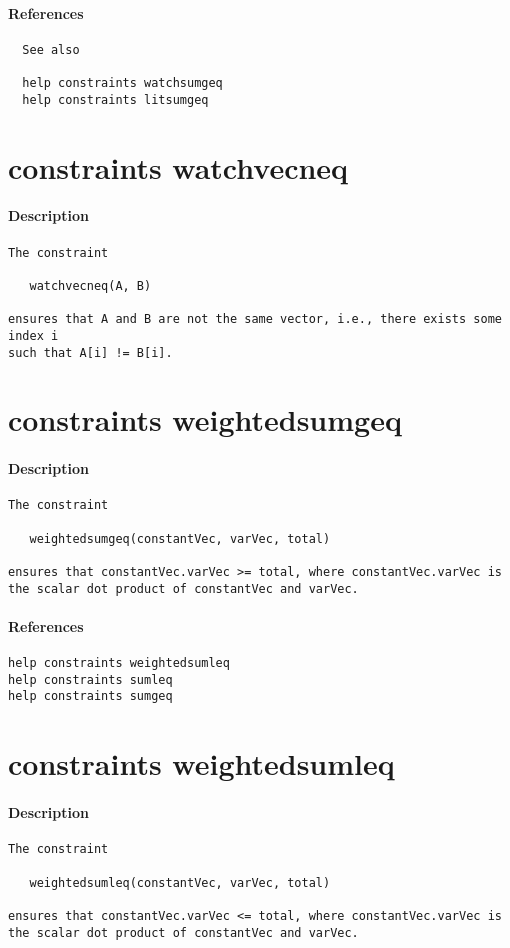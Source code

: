 \paragraph{References}
{\footnotesize
\begin{verbatim}
  See also

  help constraints watchsumgeq
  help constraints litsumgeq
\end{verbatim}
}
\section{constraints watchvecneq}
\paragraph{Description}
{\footnotesize
\begin{verbatim}
The constraint

   watchvecneq(A, B)

ensures that A and B are not the same vector, i.e., there exists some index i
such that A[i] != B[i].
\end{verbatim}
}
\section{constraints weightedsumgeq}
\paragraph{Description}
{\footnotesize
\begin{verbatim}
The constraint

   weightedsumgeq(constantVec, varVec, total)

ensures that constantVec.varVec >= total, where constantVec.varVec is
the scalar dot product of constantVec and varVec.
\end{verbatim}
}
\paragraph{References}
{\footnotesize
\begin{verbatim}
help constraints weightedsumleq
help constraints sumleq
help constraints sumgeq
\end{verbatim}
}
\section{constraints weightedsumleq}
\paragraph{Description}
{\footnotesize
\begin{verbatim}
The constraint

   weightedsumleq(constantVec, varVec, total)

ensures that constantVec.varVec <= total, where constantVec.varVec is
the scalar dot product of constantVec and varVec.
\end{verbatim}
}
